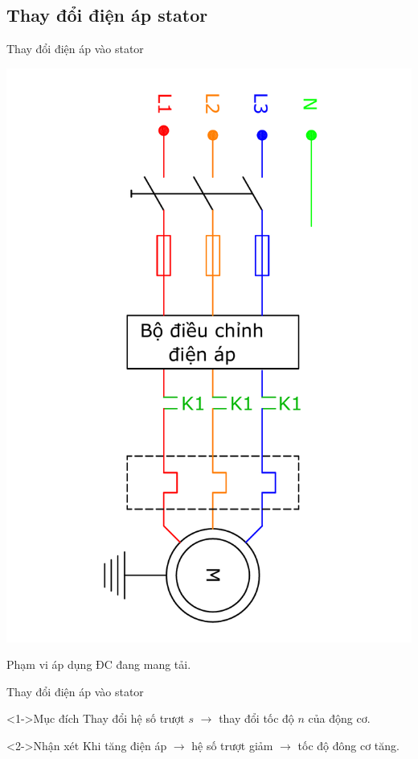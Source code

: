 \documentclass[20pt]{beamer}
\begin{document}
\subsection*{Thay đổi điện áp stator}
\begin{frame}{Thay đổi điện áp vào stator}
	\vspace{-3.3cm}
	\begin{center}
		\includegraphics[scale=0.4, angle = 90]{../sodomach/dieu-chinh-dien-ap-stator.pdf}
	\end{center}
	\vspace{-3cm}
	\begin{block}{Phạm vi áp dụng}
		ĐC đang mang tải.
	\end{block}
\end{frame}

\begin{frame}{Thay đổi điện áp vào stator}
	\begin{block}<1->{Mục đích}
		\justifying
		Thay đổi \textcolor{doden}{hệ số trượt $s$} $\longrightarrow$ thay đổi \textcolor{doden}{tốc độ $n$ của động cơ}.
   \end{block}
   
   \begin{block}<2->{Nhận xét}
   		\justifying
		Khi \textcolor{doden}{tăng điện áp} $\longrightarrow$ \textcolor{doden}{hệ số trượt giảm} $\longrightarrow$ \textcolor{doden}{tốc độ đông cơ tăng}.
   \end{block}
\end{frame}
\end{document}

